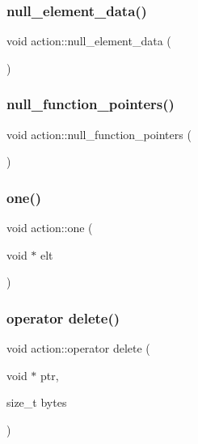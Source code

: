 \mbox{\label{classaction_a90cd98bea15f55a3c25cb9c6b68685df}} 
\subsubsection{\texorpdfstring{null\+\_\+element\+\_\+data()}{null\_element\_data()}}
{\footnotesize\ttfamily void action\+::null\+\_\+element\+\_\+data (\begin{DoxyParamCaption}{ }\end{DoxyParamCaption})}

\mbox{\label{classaction_a1359d74a665e82a098fba5c1c1249dde}} 
\subsubsection{\texorpdfstring{null\+\_\+function\+\_\+pointers()}{null\_function\_pointers()}}
{\footnotesize\ttfamily void action\+::null\+\_\+function\+\_\+pointers (\begin{DoxyParamCaption}{ }\end{DoxyParamCaption})}

\mbox{\label{classaction_add7bc79f24ce000a0ca5a7c3f2ec6a55}} 
\subsubsection{\texorpdfstring{one()}{one()}}
{\footnotesize\ttfamily void action\+::one (\begin{DoxyParamCaption}\item[{void $\ast$}]{elt }\end{DoxyParamCaption})}

\mbox{\label{classaction_a41130e4f504419cdd6720fc55e509f1e}} 
\subsubsection{\texorpdfstring{operator delete()}{operator delete()}}
{\footnotesize\ttfamily void action\+::operator delete (\begin{DoxyParamCaption}\item[{void $\ast$}]{ptr,  }\item[{size\+\_\+t}]{bytes }\end{DoxyParamCaption})}

